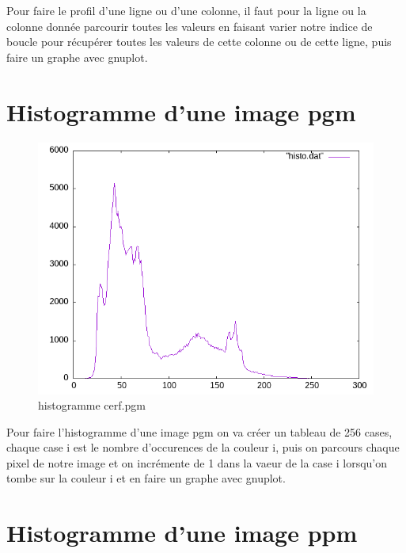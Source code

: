 \documentclass{article}
\begin{document}
Pour faire le profil d'une ligne ou d'une colonne, il faut pour la ligne ou la colonne donnée parcourir toutes les valeurs en faisant varier notre indice de boucle pour récupérer toutes les valeurs de cette colonne ou de cette ligne, puis faire un graphe avec gnuplot.

\newpage
\section{Histogramme d'une image pgm}

\begin{figure}[h]
\centerline{\includegraphics[scale=0.5]{./rendus/histopgmcerf.png}}
\caption{histogramme cerf.pgm}
\end{figure}

Pour faire l'histogramme d'une image pgm on va créer un tableau de 256 cases, chaque case i est le nombre d'occurences de la couleur i, puis on parcours chaque pixel de notre image et on incrémente de 1 dans la vaeur de la case i lorsqu'on tombe sur la couleur i et en faire un graphe avec gnuplot.

\section{Histogramme d'une image ppm}
\end{document}
